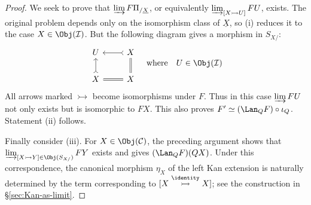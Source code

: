 \begin{proof}
	We seek to prove that $\varinjlim F\Pi_{/\underline{X}}$, or equivalently
	$\varinjlim_{[X\rightarrowtail U]}FU$, exists. The original problem depends
	only on the isomorphism class of $\underline{X}$, so (i) reduces it to the
	case $X\in\Obj(\mathcal{I})$. But the following diagram gives a morphism in
	$S_{X/}$:
	\begin{equation*}
		\begin{tikzcd}
			U & X \arrow[rightarrowtail, l] \\
			X \arrow[rightarrowtail, u] & X \arrow[equal, l] \arrow[equal, u]
		\end{tikzcd} \quad
		\text{where} \quad U \in \Obj(\mathcal{I})
	\end{equation*}
	All arrows marked $\rightarrowtail$ become isomorphisms under $F$. Thus in
	this case $\varinjlim FU$ not only exists but is isomorphic to $FX$.
	This also proves $F'\simeq(\Lan_QF)\circ\iota_Q$. Statement (ii) follows.

	Finally consider (iii). For $X\in\Obj(\mathcal{C})$, the preceding
	argument shows that
	$\varinjlim_{[X\rightarrowtail Y]\in\Obj(S_{X/})}FY$ exists and gives
	$(\Lan_QF)(QX)$. Under this correspondence, the canonical morphism
	$\eta_X$ of the left Kan extension is naturally determined by the term
	corresponding to $[X\stackrel{\identity}{\rightarrowtail}X]$; see the
	construction in \S\ref{sec:Kan-as-limit}.
\end{proof}


